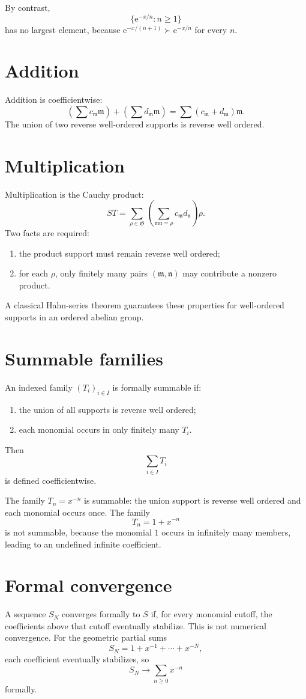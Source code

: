 \documentclass[11pt,oneside,openany]{book}
\newcommand{\G}{\mathfrak{G}}
\newcommand{\e}{\mathrm{e}}
\newcommand{\mon}{\mathfrak{m}}
\newcommand{\nmon}{\mathfrak{n}}
\theoremstyle{plain}
\theoremstyle{definition}
\theoremstyle{remark}
\begin{document}
By contrast,
\[
  \{\e^{-x/n}:n\ge1\}
\]
has no largest element, because $\e^{-x/(n+1)}\succ\e^{-x/n}$ for every $n$.

\section{Addition}
Addition is coefficientwise:
\[
  \left(\sum c_\mon\mon\right)
  +\left(\sum d_\mon\mon\right)
  =\sum(c_\mon+d_\mon)\mon.
\]
The union of two reverse well-ordered supports is reverse well ordered.

\section{Multiplication}
Multiplication is the Cauchy product:
\[
  ST=\sum_{\rho\in\G}
  \left(\sum_{\mon\nmon=\rho}c_\mon d_\nmon\right)\rho.
\]
Two facts are required:
\begin{enumerate}
  \item the product support must remain reverse well ordered;
  \item for each $\rho$, only finitely many pairs $(\mon,\nmon)$ may contribute a nonzero product.
\end{enumerate}
A classical Hahn-series theorem guarantees these properties for well-ordered supports in an ordered abelian group.

\section{Summable families}
An indexed family $(T_i)_{i\in I}$ is formally summable if:
\begin{enumerate}
  \item the union of all supports is reverse well ordered;
  \item each monomial occurs in only finitely many $T_i$.
\end{enumerate}
Then
\[
  \sum_{i\in I}T_i
\]
is defined coefficientwise.

\begin{worked}
The family $T_n=x^{-n}$ is summable: the union support is reverse well ordered and each monomial occurs once. The family
\[
  T_n=1+x^{-n}
\]
is not summable, because the monomial $1$ occurs in infinitely many members, leading to an undefined infinite coefficient.
\end{worked}

\section{Formal convergence}
A sequence $S_N$ converges formally to $S$ if, for every monomial cutoff, the coefficients above that cutoff eventually stabilize. This is not numerical convergence. For the geometric partial sums
\[
  S_N=1+x^{-1}+\cdots+x^{-N},
\]
each coefficient eventually stabilizes, so
\[
  S_N\longrightarrow\sum_{n\ge0}x^{-n}
\]
formally.
\end{document}
